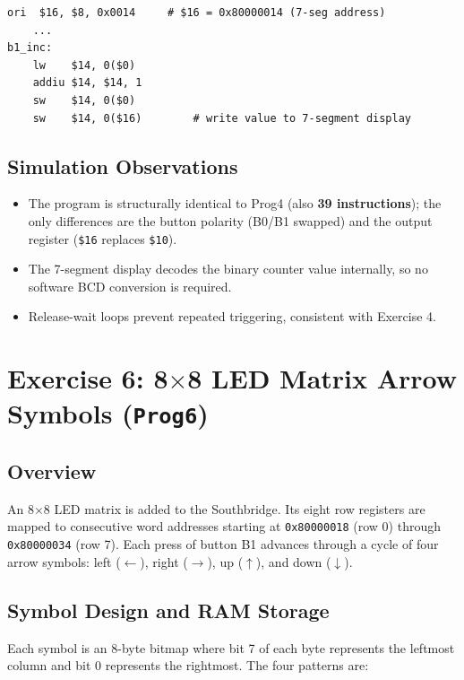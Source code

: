 \documentclass[12pt,a4paper]{article}
\begin{document}
\begin{lstlisting}[style=mips, caption={Initialisation and 7-Segment Store}]
    ori  $16, $8, 0x0014     # $16 = 0x80000014 (7-seg address)
    ...
b1_inc:
    lw    $14, 0($0)
    addiu $14, $14, 1
    sw    $14, 0($0)
    sw    $14, 0($16)        # write value to 7-segment display
\end{lstlisting}

\subsection{Simulation Observations}
\begin{itemize}
    \item The program is structurally identical to Prog4 (also \textbf{39 instructions}); the only differences are the button polarity (B0/B1 swapped) and the output register (\texttt{\$16} replaces \texttt{\$10}).
    \item The 7-segment display decodes the binary counter value internally, so no software BCD conversion is required.
    \item Release-wait loops prevent repeated triggering, consistent with Exercise 4.
\end{itemize}

\newpage
\section{Exercise 6: 8$\times$8 LED Matrix Arrow Symbols (\texttt{Prog6})}

\subsection{Overview}
An 8$\times$8 LED matrix is added to the Southbridge. Its eight row registers are mapped to consecutive word addresses starting at \texttt{0x80000018} (row 0) through \texttt{0x80000034} (row 7). Each press of button B1 advances through a cycle of four arrow symbols: left ($\leftarrow$), right ($\rightarrow$), up ($\uparrow$), and down ($\downarrow$).

\subsection{Symbol Design and RAM Storage}
Each symbol is an 8-byte bitmap where bit 7 of each byte represents the leftmost column and bit 0 represents the rightmost. The four patterns are:
\end{document}

